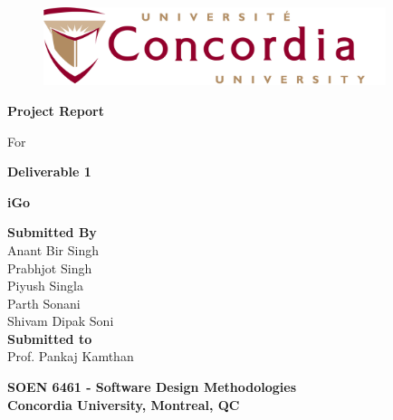 \documentclass[a4paper,12pt]{article}
\begin{document}
\begin{titlepage}

\begin{center}
\vspace*{-1.2in}
\begin{figure}[htb]
\begin{center}
\includegraphics[width=10cm]{Concordia_logo.png}
\end{center}
\end{figure}
\begin{Large}
\vspace*{0.3in}
\textbf{Project Report} \\
\end{Large}
\vspace*{0.1in}
\begin{Large}
For\\
\end{Large}
\vspace*{0.1in}

\begin{Large}
\textbf{Deliverable 1} \\
\end{Large}
\vspace*{0.1in}

\begin{Large}
\textbf{iGo} \\
\end{Large}
\vspace*{0.3in}

\begin{large}
\textbf{Submitted By} \\
\vspace*{0.1in}
Anant Bir Singh\\
Prabhjot Singh\\
Piyush Singla\\
Parth Sonani\\
Shivam Dipak Soni\\
\vspace*{0.2in}
\textbf{Submitted to}\\
\vspace*{0.1in}
Prof. Pankaj Kamthan\\
\vspace*{0.3in}

\begin{Large}
\textbf{SOEN 6461 - Software Design Methodologies} \\
\vspace*{0.2in}
\textbf{Concordia University, Montreal, QC}
\end{Large}

\end{large}
\end{center}
\end{titlepage}
\end{document}
